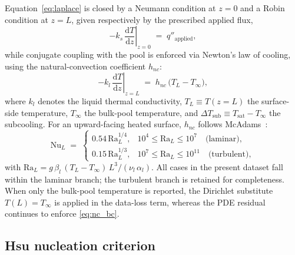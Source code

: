 Equation~\eqref{eq:laplace} is closed by a Neumann condition at $z=0$ and
a Robin condition at $z=L$, given respectively by the prescribed applied
flux,
%
\begin{equation}\label{eq:neumann_wall}
-k_s\,\left.\frac{\mathrm{d}T}{\mathrm{d}z}\right|_{z=0}
\;=\; q''_{\mathrm{applied}},
\end{equation}
%
while conjugate coupling with the pool is enforced via Newton's law of
cooling, using the natural-convection coefficient $h_{nc}$:
%
\begin{equation}\label{eq:nc_bc}
-k_l\,\left.\frac{\mathrm{d}T}{\mathrm{d}z}\right|_{z=L}
\;=\; h_{nc}\,\bigl(T_L - T_{\infty}\bigr),
\end{equation}
%
where $k_l$ denotes the liquid thermal conductivity,
$T_L \equiv T(z{=}L)$ the surface-side temperature, $T_{\infty}$ the
bulk-pool temperature, and
$\Delta T_{\mathrm{sub}} \equiv T_{\mathrm{sat}} - T_{\infty}$ the
subcooling. For an
upward-facing heated surface, $h_{nc}$ follows
McAdams~\citep{incropera,lienhard1981}:
%
\begin{equation}\label{eq:nu_nc}
\mathrm{Nu}_L \;=\;
\begin{cases}
0.54\,\mathrm{Ra}_L^{1/4}, & 10^{4} \le \mathrm{Ra}_L \le 10^{7} \quad\text{(laminar)},\\[2pt]
0.15\,\mathrm{Ra}_L^{1/3}, & 10^{7} \le \mathrm{Ra}_L \le 10^{11} \quad\text{(turbulent)},
\end{cases}
\end{equation}
%
with $\mathrm{Ra}_L = g\,\beta_l\,(T_L - T_{\infty})\,L^{3}/(\nu_l\,\alpha_l)$.
All cases in the present dataset fall within the laminar branch; the
turbulent branch is retained for completeness. When only the bulk-pool
temperature is reported, the Dirichlet substitute $T(L) = T_{\infty}$ is
applied in the data-loss term, whereas the PDE residual continues to
enforce \cref{eq:nc_bc}.

\subsection{Hsu nucleation criterion}\label{subsec:hsu}

